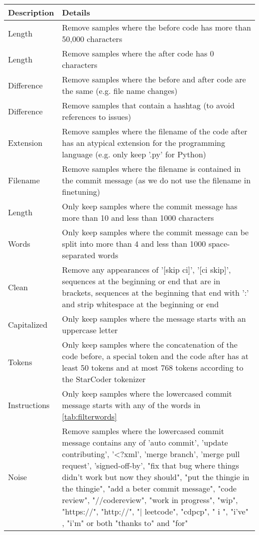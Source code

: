 \begin{table}[htbp]
\centering
\begin{tabular}{p{2cm} p{11cm}}
\toprule
\textbf{Description} & \textbf{Details} \\
\midrule
Length & Remove samples where the before code has more than 50,000 characters\\
Length & Remove samples where the after code has 0 characters\\
Difference & Remove samples where the before and after code are the same (e.g. file name changes)\\
Difference & Remove samples that contain a hashtag (to avoid references to issues) \\
Extension & Remove samples where the filename of the code after has an atypical extension for the programming language (e.g. only keep '.py' for Python) \\
Filename & Remove samples where the filename is contained in the commit message (as we do not use the filename in finetuning)\\
Length & Only keep samples where the commit message has more than 10 and less than 1000 characters\\
Words & Only keep samples where the commit message can be split into more than 4 and less than 1000 space-separated words\\
Clean & Remove any appearances of '[skip ci]', '[ci skip]', sequences at the beginning or end that are in brackets, sequences at the beginning that end with ':' and strip whitespace at the beginning or end\\
Capitalized & Only keep samples where the message starts with an uppercase letter\\
Tokens & Only keep samples where the concatenation of the code before, a special token and the code after has at least 50 tokens and at most 768 tokens according to the StarCoder tokenizer\\
Instructions & Only keep samples where the lowercased commit message starts with any of the words in \autoref{tab:filterwords} \\
Noise & Remove samples where the lowercased commit message contains any of 'auto commit', 'update contributing', '<?xml', 'merge branch', 'merge pull request', 'signed-off-by', "fix that bug where things didn't work but now they should", "put the thingie in the thingie", "add a beter commit message", "code review", "//codereview", "work in progress", "wip", "https://", "http://", "| leetcode", "cdpcp", " i ", "i've" , "i'm" or both "thanks to" and "for" \\

\end{tabular}
\end{table}
